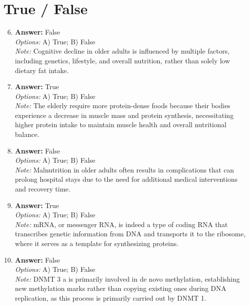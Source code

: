 \documentclass[12pt]{article}
\begin{document}
\section*{True / False}
\begin{enumerate}[label=\arabic*.]
\setcounter{enumi}{5}
\item \textbf{Answer:} False
\\ \textit{Options:} A) True; B) False
\\ \textit{Note:} Cognitive decline in older adults is influenced by multiple factors, including genetics, lifestyle, and overall nutrition, rather than solely low dietary fat intake.
\item \textbf{Answer:} True
\\ \textit{Options:} A) True; B) False
\\ \textit{Note:} The elderly require more protein-dense foods because their bodies experience a decrease in muscle mass and protein synthesis, necessitating higher protein intake to maintain muscle health and overall nutritional balance.
\item \textbf{Answer:} False
\\ \textit{Options:} A) True; B) False
\\ \textit{Note:} Malnutrition in older adults often results in complications that can prolong hospital stays due to the need for additional medical interventions and recovery time.
\item \textbf{Answer:} True
\\ \textit{Options:} A) True; B) False
\\ \textit{Note:} mRNA, or messenger RNA, is indeed a type of coding RNA that transcribes genetic information from DNA and transports it to the ribosome, where it serves as a template for synthesizing proteins.
\item \textbf{Answer:} False
\\ \textit{Options:} A) True; B) False
\\ \textit{Note:} DNMT 3 a is primarily involved in de novo methylation, establishing new methylation marks rather than copying existing ones during DNA replication, as this process is primarily carried out by DNMT 1.
\end{enumerate}
\end{document}

